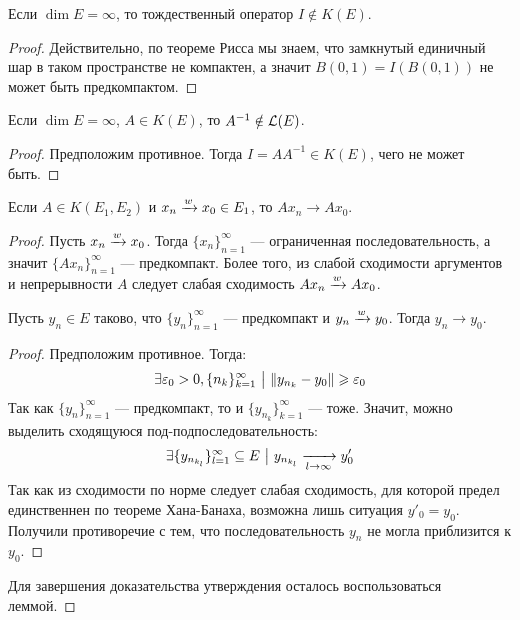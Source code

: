 \begin{proposition}
	Если $\dim E = \infty$, то тождественный оператор $I \notin K(E)$.
\end{proposition}

\begin{proof}
	Действительно, по теореме Рисса мы знаем, что замкнутый единичный шар в таком пространстве не компактен, а значит $B(0, 1) = I(B(0, 1))$ не может быть предкомпактом.
\end{proof}

\begin{corollary}
	Если $\dim E = \infty$, $A \in K(E)$, то $A^{-1} \notin \mathcal{L}(E)$.
\end{corollary}

\begin{proof}
	Предположим противное. Тогда $I = AA^{-1} \in K(E)$, чего не может быть.
\end{proof}

\begin{proposition}
	Если $A \in K(E_1, E_2)$ и $x_n \xrightarrow{w} x_0 \in E_1$, то $Ax_n \to Ax_0$.
\end{proposition}

\begin{proof}
	Пусть $x_n \xrightarrow{w} x_0$. Тогда $\{x_n\}_{n = 1}^\infty$ --- ограниченная последовательность, а значит $\{Ax_n\}_{n = 1}^\infty$ --- предкомпакт. Более того, из слабой сходимости аргументов и непрерывности $A$ следует слабая сходимость $Ax_n \xrightarrow{w} Ax_0$.
	\begin{lemma}
		Пусть $y_n \in E$ таково, что $\{y_n\}_{n = 1}^\infty$ --- предкомпакт и $y_n \xrightarrow{w} y_0$. Тогда $y_n \to y_0$.
	\end{lemma}
	
	\begin{proof}
		Предположим противное. Тогда:
		\[
			\exists \varepsilon_0 > 0, \{n_k\}_{k = 1}^\infty \ \big|\  \|y_{n_k} - y_0\| \geqslant \varepsilon_0
		\]
		Так как $\{y_n\}_{n = 1}^\infty$ --- предкомпакт, то и $\{y_{n_k}\}_{k = 1}^\infty$ --- тоже. Значит, можно выделить сходящуюся под-подпоследовательность:
		\[
			\exists \{y_{n_{k_l}}\}_{l = 1}^\infty \subseteq E \ \big|\  y_{n_{k_l}} \xrightarrow[l \to \infty]{} y'_0
		\]
		Так как из сходимости по норме следует слабая сходимость, для которой предел единственнен по теореме Хана-Банаха, возможна лишь ситуация $y'_0 = y_0$. Получили противоречие с тем, что последовательность $y_n$ не могла приблизится к $y_0$.
	\end{proof}
	Для завершения доказательства утверждения осталось воспользоваться леммой.
\end{proof}

